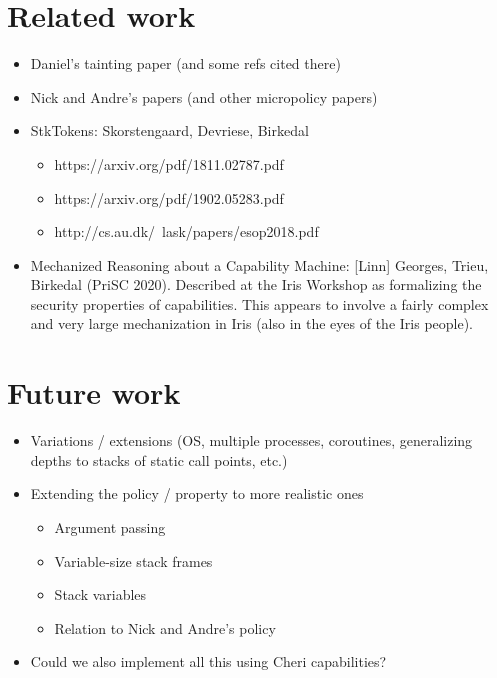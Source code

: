 \documentclass[conference]{IEEEtran}
\newif\iftext \textfalse
\begin{document}
\section{Related work}

\begin{itemize}
\item Daniel's tainting paper (and some refs cited there)
\item Nick and Andre's papers (and other micropolicy papers)
\item StkTokens: Skorstengaard, Devriese, Birkedal
\begin{itemize}
\item {https://arxiv.org/pdf/1811.02787.pdf}
\item {https://arxiv.org/pdf/1902.05283.pdf}
\item {http://cs.au.dk/~lask/papers/esop2018.pdf}
\end{itemize}


\item Mechanized Reasoning about a Capability Machine: [Linn] Georges,
Trieu, Birkedal (PriSC 2020).
%
Described at the Iris Workshop as formalizing the security properties of
capabilities. This appears to involve a fairly complex and very large
mechanization in Iris (also in the eyes of the Iris people).
\end{itemize}

\iftext
\section{Future work}

\begin{itemize}
\item Variations / extensions (OS, multiple processes, coroutines, generalizing depths to stacks of static call points, etc.)
\item Extending the policy / property to more realistic ones
\begin{itemize}
\item Argument passing
\item Variable-size stack frames
\item Stack variables
\item Relation to Nick and Andre’s policy
\end{itemize}
\item Could we also implement all this using Cheri capabilities?
\end{itemize}
\end{document}
